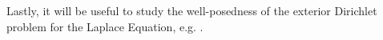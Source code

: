 \begin{proposition}

\end{proposition}
Lastly, it will be useful to study the well-posedness of the exterior Dirichlet problem for the Laplace Equation, e.g. \cite{salsa2016partial}.
